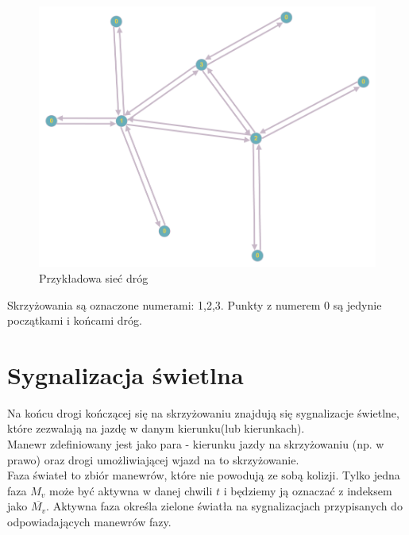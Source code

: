 \documentclass[12pt]{book}
\begin{document}
\begin{minipage}{12cm}
\begin{figure}[H]
\includegraphics[width=12cm]{network}
\caption{\label{fig:network} Przykładowa sieć dróg}
\end{figure}
\end{minipage} \hfill
\begin{minipage}{5cm}
Skrzyżowania są oznaczone numerami: 1,2,3.
Punkty z numerem 0 są jedynie początkami i końcami dróg.
\end{minipage}
\section{Sygnalizacja świetlna}
Na końcu drogi kończącej się na skrzyżowaniu znajdują się sygnalizacje świetlne, które zezwalają na jazdę w danym kierunku(lub kierunkach). \\
Manewr zdefiniowany jest jako para - kierunku jazdy na skrzyżowaniu (np. w prawo) oraz drogi umożliwiającej wjazd na to skrzyżowanie.\\ Faza świateł to zbiór manewrów, które nie powodują ze sobą kolizji. Tylko jedna faza $M_v$ może być aktywna w danej chwili $t$ i będziemy ją oznaczać z indeksem jako $\overline{M_v}$. Aktywna faza określa zielone światła na sygnalizacjach przypisanych do odpowiadających manewrów fazy.
\newpage
\end{document}
